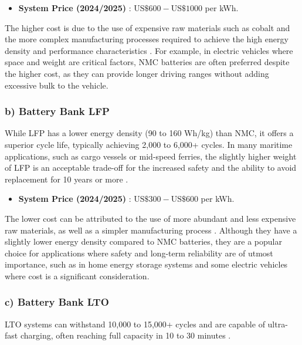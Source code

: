 \begin{itemize}
	\item \textbf{System Price (2024/2025)} \cite{ritarpower}: $\text{US}\$600-\text{US}\$1000$ per kWh.	
\end{itemize}

The higher cost is due to the use of expensive raw materials such as cobalt and the more complex manufacturing processes required to achieve the high energy density and performance characteristics \cite{ritarpower}. For example, in electric vehicles where space and weight are critical factors, NMC batteries are often preferred despite the higher cost, as they can provide longer driving ranges without adding excessive bulk to the vehicle.

\subsubsection{b) Battery Bank LFP}

While LFP has a lower energy density (90 to 160 Wh/kg) than NMC, it offers a superior cycle life, typically achieving 2,000 to 6,000+ cycles. In many maritime applications, such as cargo vessels or mid-speed ferries, the slightly higher weight of LFP is an acceptable trade-off for the increased safety and the ability to avoid replacement for 10 years or more \cite{evlithium}. 
\begin{itemize}
	\item \textbf{System Price (2024/2025)} \cite{ritarpower}: $\text{US}\$300-\text{US}\$600$ per kWh.
\end{itemize}

The lower cost can be attributed to the use of more abundant and less expensive raw materials, as well as a simpler manufacturing process \cite{ritarpower}. Although they have a slightly lower energy density compared to NMC batteries, they are a popular choice for applications where safety and long-term reliability are of utmost importance, such as in home energy storage systems and some electric vehicles where cost is a significant consideration.

\subsubsection{c) Battery Bank LTO}

LTO systems can withstand 10,000 to 15,000+ cycles and are capable of ultra-fast charging, often reaching full capacity in 10 to 30 minutes \cite{evlithium}.

